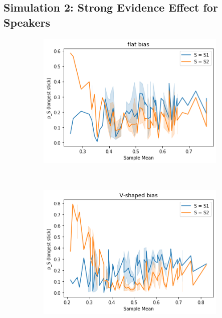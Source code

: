 \documentclass[10pt,letterpaper]{article}
\begin{document}
\subsection{Simulation 2: Strong Evidence Effect for Speakers}
\begin{figure}[h]
\centering
\begin{subfigure}{0.45\textwidth}
	\includegraphics[width=\textwidth]{figures/see_maxVsSampleMeanFlat.png}
\end{subfigure}
~
\begin{subfigure}{0.45\textwidth}
	\includegraphics[width=\textwidth]{figures/see_maxVsSampleMeanV.png}
\end{subfigure}


\end{figure}
\end{document}
